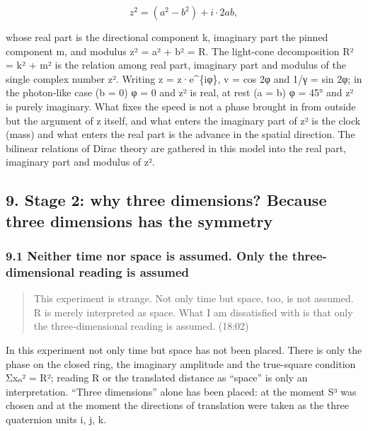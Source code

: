 \documentclass[
  a4paper,
]{article}
\begin{document}
\[
z^2=(a^2-b^2)+i\cdot2ab,
\]

whose real part is the directional component k, imaginary part the
pinned component m, and modulus \textbar z²\textbar{} = a² + b² = R. The
light-cone decomposition R² = k² + m² is the relation among real part,
imaginary part and modulus of the single complex number z². Writing z =
\textbar z\textbar·e\^{}\{iφ\}, v = cos 2φ and 1/γ = sin 2φ; in the
photon-like case (b = 0) φ = 0 and z² is real, at rest (a = b) φ = 45°
and z² is purely imaginary. What fixes the speed is not a phase brought
in from outside but the argument of z itself, and what enters the
imaginary part of z² is the clock (mass) and what enters the real part
is the advance in the spatial direction. The bilinear relations of Dirac
theory are gathered in this model into the real part, imaginary part and
modulus of z².

\subsection{9. Stage 2: why three dimensions? Because three dimensions
has the
symmetry}\label{stage-2-why-three-dimensions-because-three-dimensions-has-the-symmetry}

\subsubsection{9.1 Neither time nor space is assumed. Only the
three-dimensional reading is
assumed}\label{neither-time-nor-space-is-assumed.-only-the-three-dimensional-reading-is-assumed}

\begin{quote}
This experiment is strange. Not only time but space, too, is not
assumed. R is merely interpreted as space. What I am dissatisfied with
is that only the three-dimensional reading is assumed. (18:02)
\end{quote}

In this experiment not only time but space has not been placed. There is
only the phase on the closed ring, the imaginary amplitude and the
true-square condition Σxₙ² = R²; reading R or the translated distance as
``space'' is only an interpretation. ``Three dimensions'' alone has been
placed: at the moment S³ was chosen and at the moment the directions of
translation were taken as the three quaternion units i, j, k.
\end{document}
